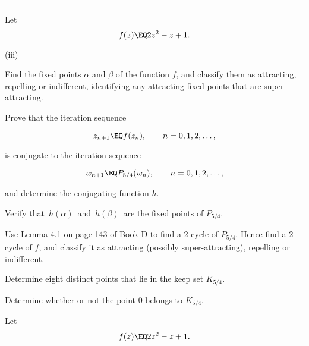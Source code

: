 \documentclass[english,a4paper,11pt]{scrartcl}
\begin{document}
\comment{===========================================================}
\noindent\rule[0.5ex]{\linewidth}{1pt} 
\newpage
\begin{Question}{}

 Let 
 \[ f(z) \EQ 2z^2 - z + 1. \]

\bigskip
\begin{labeling}{(iii) }
  \item [(i)]  Find the fixed points $\alpha$ and $\beta$ of the function $f$, and classify them as attracting, repelling or indifferent, identifying any attracting fixed points that are super-attracting.  \\
  
  \item [(ii)]  Prove that the iteration sequence
  
\[ z_{n+1} \EQ f(z_n),  \qquad n = 0,1,2,\dots, \]

is conjugate to the iteration sequence

\[ w_{n+1} \EQ P_{5/4}(w_n), \qquad n = 0,1,2, \dots, \]

and determine the conjugating function $h$. \\
  
  \item [(iii)]  Verify that \,$h(\alpha)$\, and \,$h(\beta)$\, are the fixed points of $P_{5/4}$. \\

  \item [(iv)]  Use Lemma 4.1 on page 143 of Book D to find a 2-cycle of $P_{5/4}$. Hence find a 2-cycle of $f$, and classify it as attracting (possibly super-attracting), repelling or indifferent. \\
  
  \item [(v)] Determine eight distinct points that lie in the keep set $K_{5/4}$.  \\
  
  \item [(vi)]  Determine whether or not the point 0 belongs to $K_{5/4}$. \\
  
      
\end{labeling}

\bigskip
\end{Question}

\setcounter{equation}{0}

\bigskip

 Let 
 \[ f(z) \EQ 2z^2 - z + 1. \]
\end{document}
